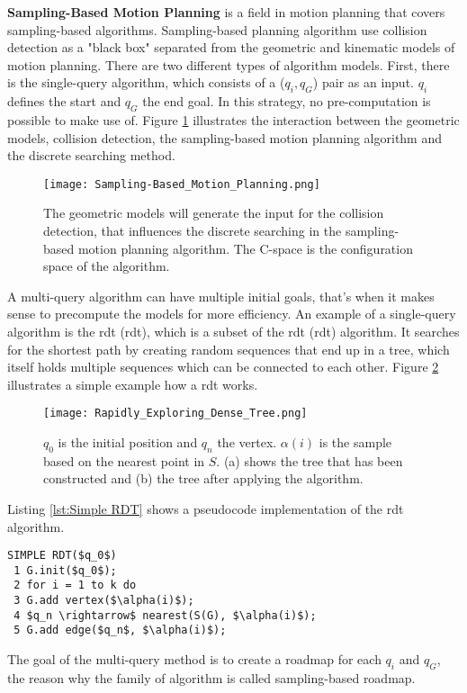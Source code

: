 \textbf{Sampling-Based Motion Planning} is a field in motion planning that covers sampling-based algorithms. Sampling-based planning algorithm use collision detection as a "black box" separated from the geometric and kinematic models of motion planning. There are two different types of algorithm models. First, there is the single-query algorithm, which consists of a ($q_i,q_G$) pair as an input. $q_i$ defines the start and $q_G$ the end goal. In this strategy, no pre-computation is possible to make use of. Figure \ref{fig:Geometric Models Collision Detection Algorithm} illustrates the interaction between the geometric models, collision detection, the sampling-based motion planning algorithm and the discrete searching method.
\begin{figure}[H]
    \centering
    \texttt{[image: Sampling-Based\_Motion\_Planning.png]}
    \caption{The geometric models will generate the input for the collision detection, that influences the discrete searching in the sampling-based motion planning algorithm. The C-space is the configuration space of the algorithm. \cite{planning_algorithms_steven_m_lavalle}}
    \label{fig:Geometric Models Collision Detection Algorithm}
\end{figure}
A multi-query algorithm can have multiple initial goals, that's when it makes sense to precompute the models for more efficiency. An example of a single-query algorithm is the \acrlong{rdt} (\acrshort{rdt}), which is a subset of the \acrlong{rdt} (\acrshort{rdt}) algorithm. It searches for the shortest path by creating random sequences that end up in a tree, which itself holds multiple sequences which can be connected to each other. Figure \ref{fig:Rapidly Exploring Dense Tree} illustrates a simple example how a \acrshort{rdt} works.
\begin{figure}[H]
    \centering
    \texttt{[image: Rapidly\_Exploring\_Dense\_Tree.png]}
    \caption{$q_0$ is the initial position and $q_n$ the vertex. $\alpha(i)$ is the sample based on the nearest point in $S$. (a) shows the tree that has been constructed and (b) the tree after applying the algorithm. \cite{planning_algorithms_steven_m_lavalle}}
    \label{fig:Rapidly Exploring Dense Tree}
\end{figure}

Listing \ref{lst:Simple RDT} shows a pseudocode implementation of the \acrshort{rdt} algorithm.
\begin{lstlisting}[mathescape=true, caption={The simple \acrshort{rdt} computes a random tree with the nearest function. \cite{planning_algorithms_steven_m_lavalle}}, label={lst:Simple RDT}]
SIMPLE RDT($q_0$)
 1 G.init($q_0$);
 2 for i = 1 to k do
 3 G.add vertex($\alpha(i)$);
 4 $q_n \rightarrow$ nearest(S(G), $\alpha(i)$);
 5 G.add edge($q_n$, $\alpha(i)$);
\end{lstlisting}
The goal of the multi-query  method is to create a roadmap for each $q_i$ and $q_G$, the reason why the family of algorithm is called sampling-based roadmap. \cite{planning_algorithms_steven_m_lavalle}

